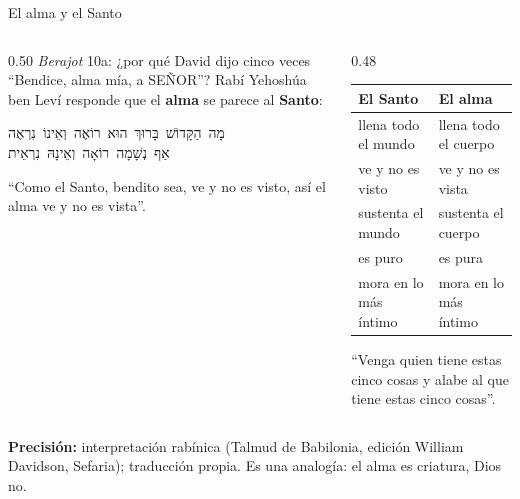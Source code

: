 \documentclass[hyperref={bookmarks=false},aspectratio=169]{beamer}
\newcommand{\heb}[1]{\mbox{\foreignlanguage{hebrew}{#1}}}
\newcommand{\SENOR}{S{\fontsize{0.78em}{1em}\selectfont EÑOR}}
\newcommand{\destacar}[1]{\textbf{\textcolor{azul}{#1}}}
\newcommand{\precision}[1]{{\footnotesize\color{gris}\textbf{Precisión:} #1}}
\begin{document}
\begin{frame}{El alma y el Santo}
\begin{columns}[t,onlytextwidth]
\begin{column}{0.50\textwidth}\small
\emph{Berajot} 10a: ¿por qué David dijo cinco veces ``Bendice, alma mía, a \SENOR''? Rabí Yehoshúa ben Leví responde que el \destacar{alma} se parece al \destacar{Santo}:
\begin{center}\scriptsize\heb{מָה הַקָּדוֹשׁ בָּרוּךְ הוּא רוֹאֶה וְאֵינוֹ נִרְאֶה}\\ \heb{אַף נְשָׁמָה רוֹאָה וְאֵינָהּ נִרְאֵית}\end{center}
``Como el Santo, bendito sea, ve y no es visto, así el alma ve y no es vista''.
\end{column}
\begin{column}{0.48\textwidth}\scriptsize\renewcommand{\arraystretch}{1.12}
\begin{tabular}{@{}>{\RaggedRight\arraybackslash}p{2.6cm}>{\RaggedRight\arraybackslash}p{2.8cm}@{}}
\toprule
\textbf{El Santo} & \textbf{El alma} \\ \midrule
llena todo el mundo & llena todo el cuerpo \\
ve y no es visto & ve y no es vista \\
sustenta el mundo & sustenta el cuerpo \\
es puro & es pura \\
mora en lo más íntimo & mora en lo más íntimo \\
\bottomrule
\end{tabular}\par\smallskip
``Venga quien tiene estas cinco cosas y alabe al que tiene estas cinco cosas''.
\end{column}
\end{columns}\par\smallskip
\precision{interpretación rabínica (Talmud de Babilonia, edición William Davidson, Sefaria); traducción propia. Es una analogía: el alma es criatura, Dios no.}
\end{frame}
\end{document}
